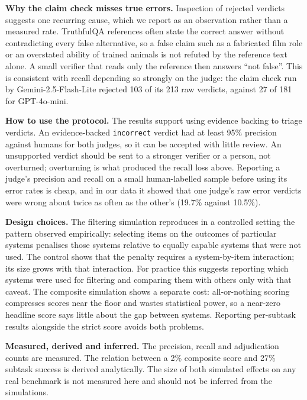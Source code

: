 \textbf{Why the claim check misses true errors.} Inspection of rejected verdicts suggests one recurring cause, which we report as an observation rather than a measured rate. TruthfulQA references often state the correct answer without contradicting every false alternative, so a false claim such as a fabricated film role or an overstated ability of trained animals is not refuted by the reference text alone. A small verifier that reads only the reference then answers ``not false''. This is consistent with recall depending so strongly on the judge: the claim check run by Gemini-2.5-Flash-Lite rejected 103 of its 213 raw verdicts, against 27 of 181 for GPT-4o-mini.

\textbf{How to use the protocol.} The results support using evidence backing to triage verdicts. An evidence-backed \texttt{incorrect} verdict had at least 95\% precision against humans for both judges, so it can be accepted with little review. An unsupported verdict should be sent to a stronger verifier or a person, not overturned; overturning is what produced the recall loss above. Reporting a judge's precision and recall on a small human-labelled sample before using its error rates is cheap, and in our data it showed that one judge's raw error verdicts were wrong about twice as often as the other's (19.7\% against 10.5\%).

\textbf{Design choices.} The filtering simulation reproduces in a controlled setting the pattern \citet{phang2022adversarially} observed empirically: selecting items on the outcomes of particular systems penalises those systems relative to equally capable systems that were not used. The control shows that the penalty requires a system-by-item interaction; its size grows with that interaction. For practice this suggests reporting which systems were used for filtering and comparing them with others only with that caveat. The composite simulation shows a separate cost: all-or-nothing scoring compresses scores near the floor and wastes statistical power, so a near-zero headline score says little about the gap between systems. Reporting per-subtask results alongside the strict score avoids both problems.

\textbf{Measured, derived and inferred.} The precision, recall and adjudication counts are measured. The relation between a 2\% composite score and 27\% subtask success is derived analytically. The size of both simulated effects on any real benchmark is not measured here and should not be inferred from the simulations.

